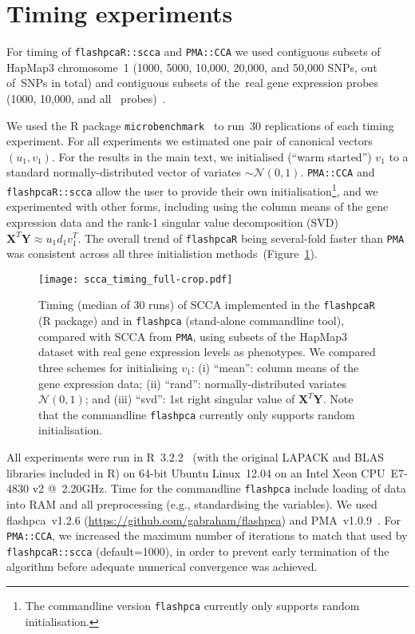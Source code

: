 \documentclass[a4paper,10pt]{article}
\begin{document}
\section{Timing experiments}

For timing of \texttt{flashpcaR::scca} and \texttt{PMA::CCA} we used
contiguous subsets of HapMap3 chromosome~1 (1000, 5000, 10,000, 20,000,
and 50,000 SNPs, out of~\nsnpschr SNPs in total) and contiguous subsets
of the~\ngenes real gene expression probes (1000, 10,000, and all~\ngenes
probes)~\citep{Stranger2012}.

We used the \textsf{R} package \texttt{microbenchmark}~\citep{Mersmann2015}
to run~30 replications of each timing experiment.  For all
experiments we estimated one pair of canonical vectors $(u_1,
v_1)$.  For the results in the main text, we initialised (``warm
started'') $v_1$ to a standard normally-distributed vector of variates
$\sim\mathcal{N}(0,1)$. \texttt{PMA::CCA} and \texttt{flashpcaR::scca}
allow the user to provide their own initialisation\footnote{The commandline
version \texttt{flashpca} currently only supports random initialisation.},
and we experimented with other forms, including using the column means
of the gene expression data and the rank-1 singular value decomposition
(SVD) $\mathbf{X}^T \mathbf{Y} \approx u_1 d_1 v_1^T$. The overall trend of
\texttt{flashpcaR} being several-fold faster than \texttt{PMA} was consistent
across all three initialistion methods~(Figure~\ref{fig:s01}).

\begin{figure}[!tpb]
\centering
\texttt{[image: scca\_timing\_full-crop.pdf]}
\caption{
Timing (median of 30 runs) of SCCA implemented in the \texttt{flashpcaR}
(\textsf{R} package) and in \texttt{flashpca} (stand-alone commandline tool),
compared with SCCA from \texttt{PMA}, using subsets of the HapMap3 dataset with real
gene expression levels as phenotypes. We compared three schemes for initialising
$v_1$: (i) ``mean'': column means of the gene expression data; (ii) ``rand'':
normally-distributed variates $\mathcal{N}(0, 1)$; and (iii) ``svd'': 1st
right singular value of $\mathbf{X}^T \mathbf{Y}$. Note that the commandline
\texttt{flashpca} currently only supports random initialisation.
}
\label{fig:s01}
\end{figure}

All experiments were run in \textsf{R}~3.2.2~\citep{R} (with the original
LAPACK and BLAS libraries included in \textsf{R}) on 64-bit Ubuntu
Linux~12.04 on an Intel Xeon CPU~E7-4830 v2 @~2.20GHz. Time for the
commandline \texttt{flashpca} include loading of data into RAM and all
preprocessing (e.g., standardising the variables). We used flashpca~v1.2.6
(\url{https://github.com/gabraham/flashpca}) and PMA~v1.0.9~\citep{Witten2013}.
For \texttt{PMA::CCA}, we increased the maximum number of iterations to match
that used by \texttt{flashpcaR::scca} (default=1000), in order to prevent
early termination of the algorithm before adequate numerical convergence
was achieved.
\end{document}
